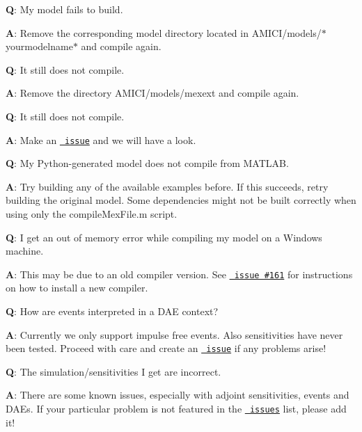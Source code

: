 {\bfseries{Q}}\+: My model fails to build.

{\bfseries{A}}\+: Remove the corresponding model directory located in A\+M\+I\+C\+I/models/$\ast$yourmodelname$\ast$ and compile again.



{\bfseries{Q}}\+: It still does not compile.

{\bfseries{A}}\+: Remove the directory A\+M\+I\+C\+I/models/{\ttfamily mexext} and compile again.



{\bfseries{Q}}\+: It still does not compile.

{\bfseries{A}}\+: Make an \href{https://github.com/ICB-DCM/AMICI/issues}{\texttt{ issue}} and we will have a look.



{\bfseries{Q}}\+: My Python-\/generated model does not compile from M\+A\+T\+L\+AB.

{\bfseries{A}}\+: Try building any of the available examples before. If this succeeds, retry building the original model. Some dependencies might not be built correctly when using only the {\ttfamily compile\+Mex\+File.\+m} script.



{\bfseries{Q}}\+: I get an out of memory error while compiling my model on a Windows machine.

{\bfseries{A}}\+: This may be due to an old compiler version. See \href{https://github.com/AMICI-dev/AMICI/issues/161}{\texttt{ issue \#161}} for instructions on how to install a new compiler.



{\bfseries{Q}}\+: How are events interpreted in a D\+AE context?

{\bfseries{A}}\+: Currently we only support impulse free events. Also sensitivities have never been tested. Proceed with care and create an \href{https://github.com/AMICI-dev/AMICI/issues}{\texttt{ issue}} if any problems arise!



{\bfseries{Q}}\+: The simulation/sensitivities I get are incorrect.

{\bfseries{A}}\+: There are some known issues, especially with adjoint sensitivities, events and D\+A\+Es. If your particular problem is not featured in the \href{https://github.com/AMICI-dev/AMICI/issues}{\texttt{ issues}} list, please add it!

